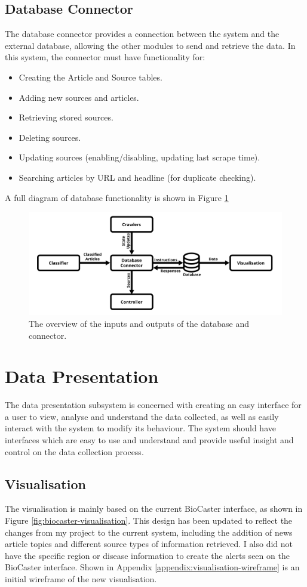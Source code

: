 \documentclass{l4proj}
\begin{document}
\subsection{Database Connector}
The database connector provides a connection between the system and the external database, allowing the other modules to send and retrieve the data. In this system, the connector must have functionality for:
\begin{itemize}
    \item Creating the Article and Source tables.
    \item Adding new sources and articles.
    \item Retrieving stored sources.
    \item Deleting sources.
    \item Updating sources (enabling/disabling, updating last scrape time).
    \item Searching articles by URL and headline (for duplicate checking). 
\end{itemize}
A full diagram of database functionality is shown in Figure \ref{fig:database_diagram}
 \begin{figure}[h]
\centering
\includegraphics[width=\textwidth]{images/Database-diagram.png}
\caption{The overview of the inputs and outputs of the database and connector.}
\label{fig:database_diagram}
\end{figure}
\section{Data Presentation}
The data presentation subsystem is concerned with creating an easy interface for a user to view, analyse and understand the data collected, as well as easily interact with the system to modify its behaviour. The system should have interfaces which are easy to use and understand and provide useful insight and control on the data collection process.

\subsection{Visualisation}
The visualisation is mainly based on the current BioCaster interface, as shown in Figure \ref{fig:biocaster-visualisation}. This design has been updated to reflect the changes from my project to the current system, including the addition of news article topics and different source types of information retrieved. I also did not have the specific region or disease information to create the alerts seen on the BioCaster interface. Shown in Appendix \ref{appendix:visualisation-wireframe} is an initial wireframe of the new visualisation. \par
\end{document}
